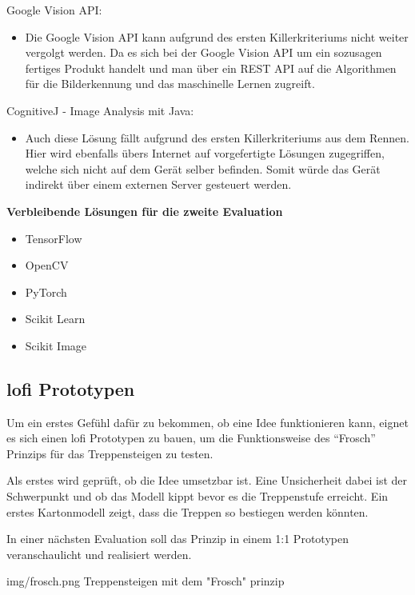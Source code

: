 Google Vision API:
\begin{itemize}
    \item Die Google Vision API kann aufgrund des ersten Killerkriteriums nicht weiter vergolgt werden. Da es sich bei der Google Vision API um ein sozusagen fertiges Produkt handelt und man über ein REST API auf die Algorithmen für die Bilderkennung und das maschinelle Lernen zugreift.
\end{itemize}

CognitiveJ - Image Analysis mit Java:
\begin{itemize}
    \item Auch diese Lösung fällt aufgrund des ersten Killerkriteriums aus dem Rennen. Hier wird ebenfalls übers Internet auf vorgefertigte Lösungen zugegriffen, welche sich nicht auf dem Gerät selber befinden. Somit würde das Gerät indirekt über einem externen Server gesteuert werden.
\end{itemize}

\textbf{Verbleibende Lösungen für die zweite Evaluation}
\begin{itemize}
    \item TensorFlow 
    \item OpenCV
    \item PyTorch
    \item Scikit Learn
    \item Scikit Image
\end{itemize}

\subsection{\acrshort{lofi} Prototypen}

Um ein erstes Gefühl dafür zu bekommen, ob eine Idee funktionieren kann, eignet es 
sich einen \acrfull{lofi} Prototypen zu bauen, um die Funktionsweise
des ``Frosch'' Prinzips für das Treppensteigen zu testen.

Als erstes wird geprüft, ob die Idee umsetzbar ist.
Eine Unsicherheit dabei ist der Schwerpunkt und ob das Modell kippt
bevor es die Treppenstufe erreicht. Ein erstes Kartonmodell zeigt,
dass die Treppen so bestiegen werden könnten.

In einer nächsten Evaluation soll das Prinzip in einem 1:1 Prototypen veranschaulicht und realisiert werden.

\image
 {img/frosch.png}
 {Treppensteigen mit dem "Frosch" prinzip}
